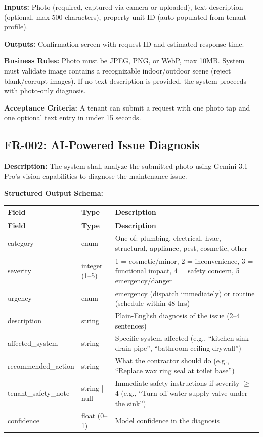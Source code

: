 \documentclass[12pt,a4paper]{article}
\begin{document}
\textbf{Inputs:} Photo (required, captured via camera or uploaded), text description (optional, max 500 characters), property unit ID (auto-populated from tenant profile).

\textbf{Outputs:} Confirmation screen with request ID and estimated response time.

\textbf{Business Rules:} Photo must be JPEG, PNG, or WebP, max 10MB. System must validate image contains a recognizable indoor/outdoor scene (reject blank/corrupt images). If no text description is provided, the system proceeds with photo-only diagnosis.

\textbf{Acceptance Criteria:} A tenant can submit a request with one photo tap and one optional text entry in under 15 seconds.

\subsection{FR-002: AI-Powered Issue Diagnosis}

\textbf{Description:} The system shall analyze the submitted photo using Gemini 3.1 Pro's vision capabilities to diagnose the maintenance issue.

\textbf{Structured Output Schema:}

\begin{longtable}{L{3.5cm} L{2.5cm} L{7.5cm}}
\toprule
\textbf{Field} & \textbf{Type} & \textbf{Description} \\
\midrule
\endfirsthead
\toprule
\textbf{Field} & \textbf{Type} & \textbf{Description} \\
\midrule
\endhead
\bottomrule
\endfoot
category & enum & One of: plumbing, electrical, hvac, structural, appliance, pest, cosmetic, other \\
\midrule
severity & integer (1--5) & 1 = cosmetic/minor, 2 = inconvenience, 3 = functional impact, 4 = safety concern, 5 = emergency/danger \\
\midrule
urgency & enum & emergency (dispatch immediately) or routine (schedule within 48 hrs) \\
\midrule
description & string & Plain-English diagnosis of the issue (2--4 sentences) \\
\midrule
affected\_system & string & Specific system affected (e.g., ``kitchen sink drain pipe'', ``bathroom ceiling drywall'') \\
\midrule
recommended\_action & string & What the contractor should do (e.g., ``Replace wax ring seal at toilet base'') \\
\midrule
tenant\_safety\_note & string | null & Immediate safety instructions if severity $\geq$ 4 (e.g., ``Turn off water supply valve under the sink'') \\
\midrule
confidence & float (0--1) & Model confidence in the diagnosis \\
\end{longtable}
\end{document}
